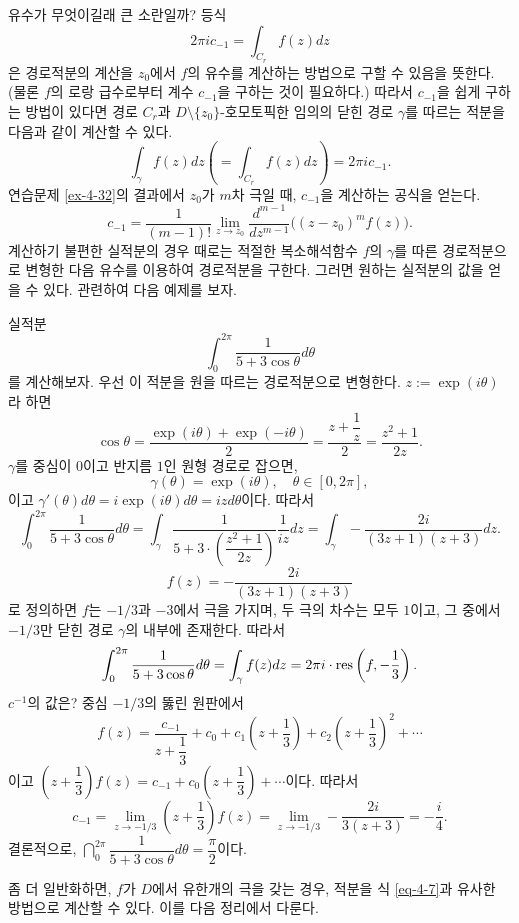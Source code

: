 유수가 무엇이길래 큰 소란일까? 등식
\[
2\pi i c_{-1}= \int_{C_r} f(z)dz 
\]
은 경로적분의 계산을 $z_0$에서 $f$의 유수를 계산하는 방법으로 구할 수 있음을 뜻한다.
(물론 $f$의 로랑 급수로부터 계수 $c_{-1}$을 구하는 것이 필요하다.)
따라서 $c_{-1}$을 쉽게 구하는 방법이 있다면
경로 $C_r$과 $D\setminus\{z_0\}$-호모토픽한 임의의 닫힌 경로 $\gamma$를 따르는 적분을
다음과 같이 계산할 수 있다.
\begin{equation} \label{eq-4-7}
\int_\gamma f(z)dz \left( = \int_{C_r} f(z)dz \right) = 2\pi i c_{-1}.
\end{equation}
연습문제 \ref{ex-4-32}의 결과에서 
$z_0$가 $m$차 극일 때,
$c_{-1}$을 계산하는 공식을 얻는다.
\[
c_{-1} = \dfrac1{(m-1)!}\lim_{z\to z_0} \dfrac{d^{m-1}}{dz^{m-1}}
\Big( (z-z_0)^m f(z) \Big).
\]
계산하기 불편한 실적분의 경우 때로는
적절한 복소해석함수 $f$의 $\gamma$를 따른 경로적분으로 변형한 다음
유수를 이용하여 경로적분을 구한다.
그러면 원하는 실적분의 값을 얻을 수 있다.
관련하여 다음 예제를 보자.

\begin{saltexample}[label=example-4-18]{}{}
실적분
\[
\int_0^{2\pi} \dfrac1{5 + 3\cos\theta} d\theta
\]
를 계산해보자.
우선 이 적분을 원을 따르는 경로적분으로 변형한다.
$z:=\exp(i\theta)$라 하면
\[
\cos\theta = \dfrac{\exp(i\theta) + \exp(-i\theta)}2 
= \dfrac{z+ \dfrac1z}2 = \dfrac{z^2+1}{2z}.
\]
$\gamma$를 중심이 $0$이고 반지름 $1$인 원형 경로로 잡으면,
\[
\gamma(\theta) = \exp(i\theta), \quad \theta \in [0,2\pi],
\]
이고 $\gamma'(\theta) d\theta = i\exp(i\theta)d\theta = izd\theta$이다.
따라서
\[
\int_0^{2\pi} \dfrac1{5 + 3\cos\theta} d\theta
= \int_\gamma \dfrac1{5+3\cdot\left(\dfrac{z^2+1}{2z}\right)}
\dfrac1{iz}dz
= \int_\gamma - \dfrac{2i}{(3z+1)(z+3)}dz.
\]
\[
f(z) = - \dfrac{2i}{(3z+1)(z+3)}
\]
로 정의하면 $f$는 $-1/3$과 $-3$에서 극을 가지며,
두 극의 차수는 모두 $1$이고,
그 중에서 $-1/3$만 닫힌 경로 $\gamma$의 내부에 존재한다.
따라서
\[
\int_0^{2\pi} \displaystyle\frac1{5 + 3\cos\theta} d\theta
= \int_\gamma f(z)dz = 2\pi i \cdot \mathop{\mathrm{res}}\left(f, -\displaystyle\frac13\right).
\]
$c^{-1}$의 값은? 중심 $-1/3$의 뚫린 원판에서
\[
f(z) = \dfrac{c_{-1}}{z+ \dfrac13} + c_0 + c_1\left(z + \dfrac13\right)
+ c_2\left(z+\dfrac13\right)^2 + \cdots
\]
이고 $\left(z+\dfrac13\right) f(z) = c_{-1} + c_0\left(z + \dfrac13\right) + \cdots$이다.
따라서
\[
c_{-1} = \lim_{z\to -1/3} \left(z+\dfrac13\right) f(z)
= \lim_{z\to -1/3} - \dfrac{2i}{3(z+3)} = - \dfrac i4.
\]
결론적으로, $\dint_0^{2\pi} \dfrac1{5 + 3\cos\theta} d\theta = \dfrac\pi2$이다.
\end{saltexample}

좀 더 일반화하면, $f$가 $D$에서 유한개의 극을 갖는 경우,
적분을 식 \eqref{eq-4-7}과 유사한 방법으로 계산할 수 있다.
이를 다음 정리에서 다룬다.

